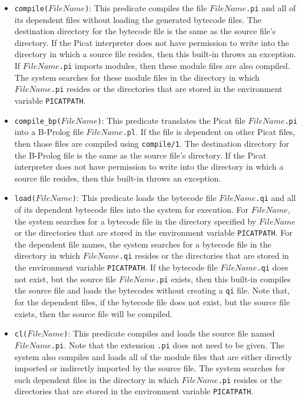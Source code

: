 \begin{itemize}
\item \texttt{compile($FileName$)}: This predicate compiles the file \texttt{$FileName$.pi} and all of its dependent files without loading the generated bytecode files.  The destination directory for the bytecode file is the same as the source file's directory.  If the Picat interpreter does not have permission to write into the directory in which a source file resides, then this built-in throws an exception. If \texttt{$FileName$.pi} imports modules, then these module files are also compiled. The system searches for these module files in the directory in which \texttt{$FileName$.pi} resides or the directories that are stored in the environment variable \texttt{PICATPATH}.

\item \texttt{compile\_bp($FileName$)}: This predicate translates the Picat file \texttt{$FileName$.pi} into a B-Prolog file \texttt{$FileName$.pl}.  If the file is dependent on other Picat files, then those files are compiled using \texttt{compile/1}.  The destination directory for the B-Prolog file is the same as the source file's directory.  If the Picat interpreter does not have permission to write into the directory in which a source file resides, then this built-in throws an exception.

\item \texttt{load($FileName$)}: This predicate loads the bytecode file \texttt{$FileName$.qi} and all of its dependent bytecode files into the system for execution.  For $FileName$, the system searches for a bytecode file in the directory specified by $FileName$ or the directories that are stored in the environment variable \texttt{PICATPATH}. For the dependent file names, the system searches for a bytecode file in the directory in which \texttt{$FileName$.qi} resides or the directories that are stored in the environment variable \texttt{PICATPATH}. If the bytecode file \texttt{$FileName$.qi} does not exist, but the source file \texttt{$FileName$.pi} exists, then this built-in compiles the source file and loads the bytecodes without creating a \texttt{qi} file.  Note that, for the dependent files, if the bytecode file does not exist, but the source file exists, then the source file will be compiled.

\item \texttt{cl($FileName$)}: This predicate compiles and loads the source file named \texttt{$FileName$.pi}.  Note that the extension \texttt{.pi} does not need to be given.  The system also compiles and loads all of the module files that are either directly imported or indirectly imported by the source file.  The system searches for such dependent files in the directory in which \texttt{$FileName$.pi} resides or the directories that are stored in the environment variable \texttt{PICATPATH}.  


\end{itemize}
